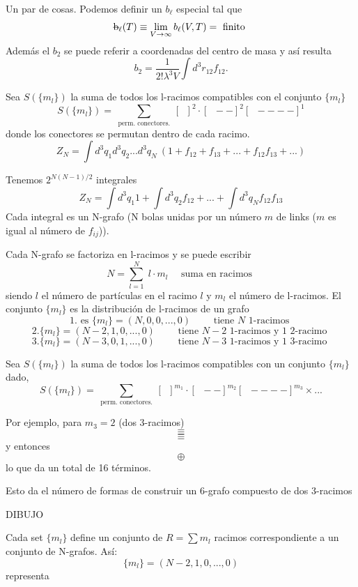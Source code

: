 \documentclass[10pt,oneside]{CBFT_book}
\begin{document}
Un par de cosas. Podemos definir un $b_\ell$ especial tal que 
\[
	\text{\sout{b}}_\ell(T) \equiv \lim_{V\to\infty} b_\ell(V,T) = \text{ finito }
\]
Además el $b_2$ se puede referir a coordenadas del centro de masa y así resulta
\[
	b_2 = \frac{1}{2! \lambda^3 V} \int d^3r_{12} f_{12}.
\]

Sea $ S( \{ m_l \} ) $ la suma de todos los l-racimos compatibles con el conjunto $ \{ m_l \}$
\[
	S( \{ m_l \} ) = \sum_{\text{ perm. conectores. }} \left[ \boxed{ \phantom{a} } \right]^2 \cdot 
	\left[ \boxed{ \phantom{a} }-- \right]^2 \left[ \boxed{ \phantom{a} } ---- \right]^1
\]
donde los conectores se permutan dentro de cada racimo.
\[
	Z_N = \int d^3q_1 d^3q_2 ... d^3q_N \: ( 1 + f_{12} + f_{13} + ... + f_{12}f_{13} + ... )
\]

Tenemos $ 2^{N(N-1)/2} $ integrales
\[
	Z_N = \int d^3q_1 1 + \int d^3q_2 f_{12} + ... + \int d^3q_N f_{12}f_{13} 
\]
Cada integral es un N-grafo (N bolas unidas por un número $m$ de links ($m$ es igual al número de $f_{ij}$)).

Cada N-grafo se factoriza en l-racimos y se puede escribir 
\[
	N = \sum_{l=1}^N  \; l \cdot m_l \quad \text{ suma en racimos }
\]
siendo $l$ el número de partículas en el racimo $l$ y $m_l$ el número de l-racimos. 
El conjunto $ \{ m_l \} $ es la distribución de l-racimos de un grafo
\[
	1. \text{ es } \{ m_l \} = ( N, 0, 0 , ..., 0 ) \qquad \text{ tiene $N$ 1-racimos }
\]
\[
	2.  \{ m_l \} = ( N-2, 1, 0 , ..., 0 ) \qquad \text{ tiene $N-2$ 1-racimos y $1$ 2-racimo }
\]
\[
	3. \{ m_l \} = ( N-3, 0, 1 , ..., 0 ) \qquad \text{ tiene $N-3$ 1-racimos y $1$ 3-racimo }
\]
\notamargen{ \[ N = N\cdot 1 \] \[ N = (N-2)\cdot 1 + 1 \cdot 2 \] \[ N = 1\cdot(N-3) + 3\cdot 1\]}

Sea $ S( \{ m_l \} ) $ la suma de todos los l-racimos compatibles con un conjunto $ \{ m_l \}$ dado,
\[
	S( \{ m_l \} ) = \sum_{\text{ perm. conectores. }} \left[ \boxed{ \phantom{a} } \right]^{m_1} \cdot 
	\left[ \boxed{ \phantom{a} }-- \right]^{m_2} \left[ \boxed{ \phantom{a} } ---- \right]^{m_3} \times ...
\]



Por ejemplo, para $m_3=2$ (dos 3-racimos)
\[
	\equiv 
\]
\[
	\equiv 
\]
y entonces 
\[
	\oplus
\]
lo que da un total de 16 términos.

Esto da el número de formas de construir un 6-grafo compuesto de dos 3-racimos

DIBUJO

Cada set $ \{ m_l \} $ define un conjunto de $ R = \sum m_l $ racimos correspondiente a un conjunto de 
N-grafos. Así:
\[
	\{ m_l \} = ( N-2, 1, 0, ..., 0 )
\]
representa
\end{document}
